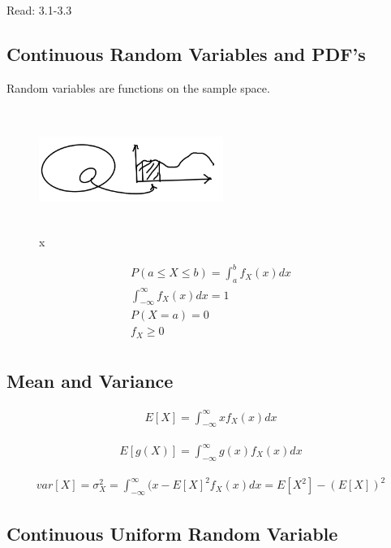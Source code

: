 

Read: 3.1-3.3

\subsection{Continuous Random Variables and PDF's}

Random variables are functions on the sample space.

\begin{figure}[!ht]
\centering
\includegraphics[width=6cm, height=4cm]{images/L08/continuous_rv.jpeg}
\caption{x}
\end{figure}

\begin{align*}
P(a \le X \le b) = \int_a^b f_X(x)dx \\
\int_{-\infty}^\infty f_X(x)dx=1 \\
P(X=a)=0 \\
f_X \ge 0\\
\end{align*}

\subsection{Mean and Variance}


\begin{align}
E[X] = \int_{-\infty}^{\infty} x f_X(x)dx
\end{align}

\begin{align}
E[g(X)] = \int_{-\infty}^{\infty} g(x) f_X(x)dx
\end{align}

\begin{align*}
var[X] = \sigma_X^2 = \int_{-\infty}^{\infty} (x - E[X]^2 f_X(x)dx = E[X^2] - (E[X])^2
\end{align*}

\subsection{Continuous Uniform Random Variable}

